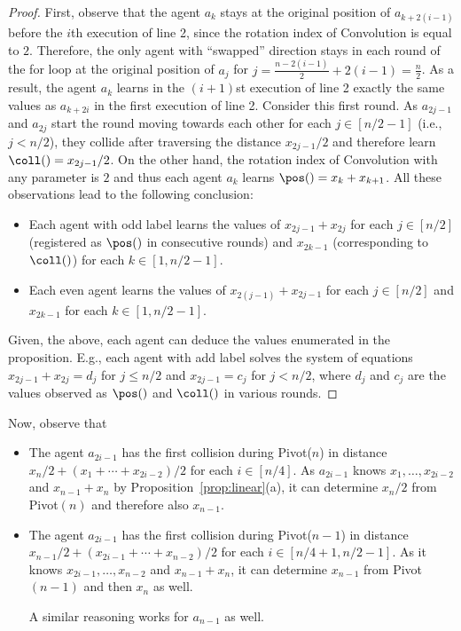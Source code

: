 \begin{proof}
First, observe that
the agent $a_k$ stays at the original position
of $a_{k+2(i-1)}$ before the $i$th execution of line 2, since the rotation index
of Convolution is equal to $2$. Therefore, the only agent with ``swapped'' direction
stays in each round of the for loop at the original position of $a_{j}$
for $j=\frac{n-2(i-1)}{2}+2(i-1)=\frac{n}2$.
As a result, the agent $a_k$ learns in the $(i+1)$st execution of line 2 exactly the same values as $a_{k+2i}$
in the first execution of line 2.
Consider this first round. As $a_{2j-1}$ and $a_{2j}$ start
the round moving towards each other for each $j\in[n/2-1]$ (i.e., $j< n/2$),
they collide after traversing the distance $x_{2j-1}/2$ and therefore learn $\coll()=x_{2j-1}/2$.
On the other hand, the rotation index of Convolution with any
parameter is $2$ and thus each agent $a_k$ learns $\pos()=x_k+x_{k+1}$.
All these observations lead to the following conclusion:
\begin{itemize}
\item
Each agent with odd label learns the values of
$x_{2j-1}+x_{2j}$ for each $j\in[n/2]$ (registered as $\pos()$ in consecutive rounds)
and $x_{2k-1}$ (corresponding to $\coll()$) for each $k\in[1,n/2-1]$.
\item
Each even agent learns the values of
$x_{2(j-1)}+x_{2j-1}$ for each $j\in[n/2]$
and $x_{2k-1}$ for each $k\in[1,n/2-1]$.
\end{itemize}
Given, the above, each agent can deduce the values enumerated
in the proposition.
E.g., each agent with add label solves the 
system of equations $x_{2j-1}+x_{2j}=d_j$ for $j\leq n/2$
and $x_{2j-1}=c_j$ for $j<n/2$, where $d_j$ and $c_j$ are
the values observed as $\pos()$ and $\coll()$ in various rounds.
\end{proof}
\else
{}
\fi
Now, observe that
\begin{itemize}
\item
The agent $a_{2i-1}$ has the first collision during Pivot($n$) in distance
$x_n/2+(x_1+\cdots+x_{2i-2})/2$ for each $i\in[n/4]$.
As $a_{2i-1}$ knows $x_1,\ldots,x_{2i-2}$ and $x_{n-1}+x_n$ by Proposition~\ref{prop:linear}(a), it can determine $x_n/2$ from Pivot$(n)$ and 
therefore also $x_{n-1}$.
\item
The agent $a_{2i-1}$ has the first collision during Pivot($n-1$) in distance
$x_{n-1}/2+(x_{2i-1}+\cdots+x_{n-2})/2$ for each $i\in[n/4+1,n/2-1]$.
As it knows $x_{2i-1},\ldots,x_{n-2}$ and $x_{n-1}+x_n$, it can
determine $x_{n-1}$ from Pivot$(n-1)$ and then $x_n$ as well.


A similar reasoning works for $a_{n-1}$ as well.
\end{itemize}
